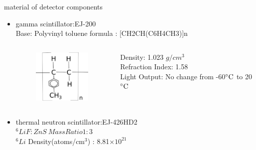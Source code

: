 \documentclass[11pt,compress,xcolor=x11names,UTF8]{beamer}
\begin{document}
\begin{frame}{ material of detector components}
\begin{itemize}
	\item gamma scintillator:EJ-200   \\
		Base: Polyvinyl toluene \quad  formula : [CH2CH(C6H4CH3)]n
\begin{columns}
\begin{column}{.23\textwidth}
\begin{figure}
	\includegraphics[width=0.97\textwidth]{currentfig/Chemical_formula_for_polyvinyl_tolulene.png}
\end{figure}
\end{column}
\begin{column}{.73\textwidth}
	Density: 1.023 $g/cm^3$\\
	Refraction Index: 1.58 \\
	Light Output: No change from -60$\celsius $ to 20 $\celsius$
\end{column}
\end{columns}
		
	\item thermal neutron scintillator:EJ-426HD2\\
	$^6LiF:ZnS \ Mass Ratio 1:3$\\
		$^6Li $ Density(atoms/cm$^3$)  : 8.81$\times 10^{21}$
\end{itemize}
\end{frame}
\end{document}
